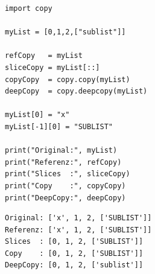 \begin{frame}[fragile]
%
\begin{tcbraster}[raster columns=2,
                  raster equal height,
                  nobeforeafter,
                  raster column skip=0.5cm]
\begin{codebox}
\begin{verbatim}
import copy

myList = [0,1,2,["sublist"]]

refCopy   = myList
sliceCopy = myList[::]
copyCopy  = copy.copy(myList)
deepCopy  = copy.deepcopy(myList)

myList[0] = "x"
myList[-1][0] = "SUBLIST"

print("Original:", myList)
print("Referenz:", refCopy)
print("Slices  :", sliceCopy)
print("Copy    :", copyCopy)
print("DeepCopy:", deepCopy)
\end{verbatim}
\end{codebox}
%
\begin{cmdbox}
\begin{verbatim}
Original: ['x', 1, 2, ['SUBLIST']]
Referenz: ['x', 1, 2, ['SUBLIST']]
Slices  : [0, 1, 2, ['SUBLIST']]
Copy    : [0, 1, 2, ['SUBLIST']]
DeepCopy: [0, 1, 2, ['sublist']]
\end{verbatim}
\end{cmdbox}
\end{tcbraster}
%
\end{frame}



